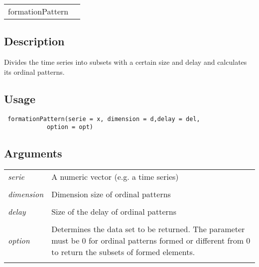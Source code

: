 \documentclass[12pt,letterpaper]{article}
\begin{document}
\hrulefill   

\begin{table}[!ht]
\begin{center}
\begin{tabularx}{\textwidth}{ X X}
\hspace{0.5cm} formationPattern & \textit{}\\
\end{tabularx}
\end{center}
\end{table}

\vspace{-0.5cm}

\hrulefill  

\vspace{0.5cm}

\subsection*{Description}

Divides the time series into subsets with a certain size and delay and calculates its ordinal patterns.

\vspace{0.5cm}

\subsection*{Usage}

\begin{lstlisting}
 formationPattern(serie = x, dimension = d,delay = del,
 			option = opt)
\end{lstlisting}

\vspace{0.5cm}

\subsection*{Arguments}

\begin{table}[!ht]
\begin{center}
\begin{tabularx}{\textwidth}{X X}
\hspace{0.5cm} \textit{serie} & A numeric vector (e.g. a time series)\\ \\
\hspace{0.5cm} \textit{dimension} & Dimension size of ordinal patterns\\ \\
\hspace{0.5cm} \textit{delay} & Size of the delay of ordinal patterns\\ \\
\hspace{0.5cm} \textit{option} & Determines the data set to be returned. The parameter must be 0 for ordinal patterns formed or different from 0 to return the subsets of formed elements.\\ \\
\end{tabularx}
\end{center}
\end{table} 
\end{document}
